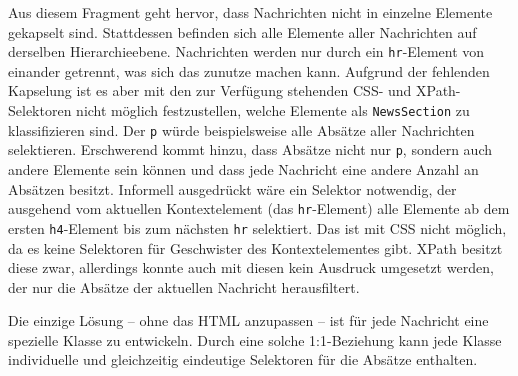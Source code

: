     Aus diesem Fragment geht hervor,
    dass Nachrichten nicht in einzelne Elemente gekapselt sind.
    Stattdessen befinden sich alle Elemente aller Nachrichten auf derselben Hierarchieebene.
    Nachrichten werden nur durch ein \texttt{hr}-Element von einander getrennt,
    was sich das {\classificationModel} zunutze machen kann.
    Aufgrund der fehlenden Kapselung ist es aber mit den zur Verfügung
    stehenden CSS- und XPath-Selektoren nicht möglich festzustellen,
    welche Elemente als \texttt{NewsSection} zu klassifizieren sind.
    Der {\cssSelector} \texttt{p} würde beispielsweise alle Absätze aller Nachrichten selektieren.
    Erschwerend kommt hinzu, dass Absätze nicht nur \texttt{p},
    sondern auch andere Elemente sein können und dass jede Nachricht eine andere Anzahl an Absätzen besitzt.
    Informell ausgedrückt wäre ein Selektor notwendig,
    der ausgehend vom aktuellen Kontextelement (das \texttt{hr}-Element) alle Elemente
    ab dem ersten \texttt{h4}-Element bis zum nächsten \texttt{hr} selektiert.
    Das ist mit CSS nicht möglich, da es keine Selektoren für Geschwister des Kontextelementes gibt.
    XPath besitzt diese zwar, allerdings konnte auch mit diesen kein
    Ausdruck umgesetzt werden, der nur die Absätze der aktuellen Nachricht herausfiltert.

    Die einzige Lösung -- ohne das HTML anzupassen -- ist für jede Nachricht eine spezielle Klasse zu entwickeln.
    Durch eine solche 1:1-Beziehung kann jede Klasse individuelle und gleichzeitig
    eindeutige Selektoren für die Absätze enthalten.

